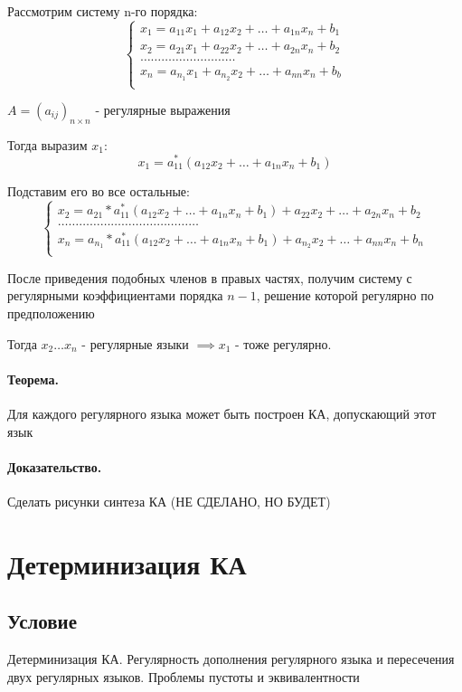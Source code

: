 \documentclass{report}
\begin{document}
Рассмотрим систему n-го порядка:
\[
\begin{cases}
	x_1=a_{11}x_1+a_{12}x_2+\ldots+a_{1n}x_{n}+b_1\\
	x_2=a_{21}x_1+a_{22}x_2+\ldots+a_{2n}x_{n}+b_2\\
	\ldots\ldots\ldots\ldots\ldots\ldots\ldots\ldots\ldots\\
	x_{n}=a_{n_1}x_1+a_{n_2}x_2+\ldots+a_{nn}x_{n}+b_{b}\\
\end{cases}
\] 

$A = (a_{ij})_{n\times n}$ - регулярные выражения

Тогда выразим $x_1$:
\[
x_1=a_{11}^{*}(a_{12}x_2+\ldots+a_{1n}x_{n}+b_1)
\] 

Подставим его во все остальные:
\[
\begin{cases}
	x_2=a_{21}*a_{11}^{*}(a_{12}x_2+\ldots+a_{1n}x_{n}+b_1)+a_{22}x_2+\ldots+a_{2n}x_{n}+b_2\\
	\ldots\ldots\ldots\ldots\ldots\ldots\ldots\ldots.\ldots\ldots\ldots\ldots\ldots\\
	x_{n}=a_{n_1}*a_{11}^{*}(a_{12}x_2+\ldots+a_{1n}x_{n}+b_1)+a_{n_2}x_2+\ldots+a_{nn}x_{n}+b_n\\
\end{cases}
\] 

После приведения подобных членов в правых частях, получим систему с регулярными коэффициентами
порядка $n-1$, решение которой регулярно по предположению

Тогда  $x_2\ldots x_{n}$ - регулярные языки $\implies x_1$ - тоже регулярно.

\medskip

\paragraph*{Теорема.}
Для каждого регулярного языка может быть построен КА, допускающий этот язык
\paragraph*{Доказательство.}
Сделать рисунки синтеза КА (НЕ СДЕЛАНО, НО БУДЕТ)

\newpage

\section{Детерминизация КА}
\subsection{Условие}
Детерминизация КА. Регулярность дополнения регулярного языка и пересечения двух
регулярных языков. Проблемы пустоты и эквивалентности
\end{document}
